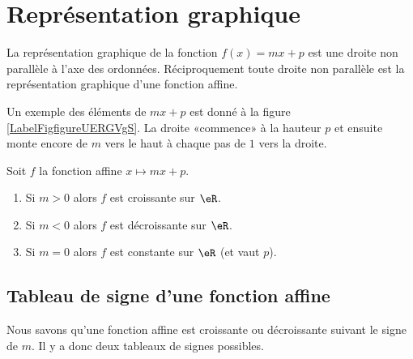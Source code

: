 \section{Représentation graphique}

\begin{Aretenir}
    La représentation graphique de la fonction \( f(x)=mx+p\) est une droite non parallèle à l'axe des ordonnées. Réciproquement toute droite non parallèle est la représentation graphique d'une fonction affine.
\end{Aretenir}


Un exemple des éléments de \( mx+p\) est donné à la figure \ref{LabelFigfigureUERGVgS}. %
La droite «commence» à la hauteur \( p\) et ensuite monte encore de \( m\) vers le haut à chaque pas de \( 1\) vers la droite.
\newcommand{\CaptionFigfigureUERGVgS}{Une droite et quelque éléments de son équation.}


\begin{Aretenir}
    Soit \( f\) la fonction affine \( x\mapsto mx+p\).
    \begin{enumerate}
        \item
            Si \( m>0\) alors \( f\) est croissante sur \( \eR\).
        \item
            Si \( m<0\) alors \( f\) est décroissante sur \( \eR\).
        \item
            Si \( m=0\) alors \( f\) est constante sur \( \eR\) (et vaut \( p\)).
    \end{enumerate}
\end{Aretenir}

\subsection{Tableau de signe d'une fonction affine}

Nous savons qu'une fonction affine est croissante ou décroissante suivant le signe de \( m\). Il y a donc deux tableaux de signes possibles.

